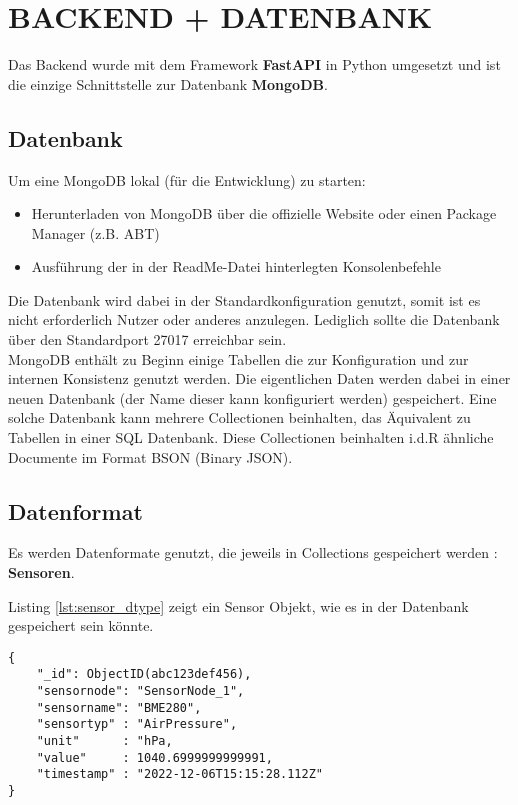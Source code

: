 \section{BACKEND + DATENBANK}\label{ch:backend}

Das Backend wurde mit dem Framework \textbf{FastAPI} in Python umgesetzt und ist die einzige Schnittstelle zur Datenbank \textbf{MongoDB}.

\subsection{Datenbank}
Um eine MongoDB lokal (für die Entwicklung) zu starten:
\begin{itemize}
\item Herunterladen von MongoDB über die offizielle Website oder einen Package Manager (z.B. ABT)
\item Ausführung der in der ReadMe-Datei hinterlegten Konsolenbefehle
\end{itemize}
Die Datenbank wird dabei in der Standardkonfiguration genutzt, somit ist es nicht erforderlich Nutzer oder anderes anzulegen.
Lediglich sollte die Datenbank über den Standardport 27017 erreichbar sein. \\

MongoDB enthält zu Beginn einige Tabellen die zur Konfiguration und zur internen Konsistenz genutzt werden.
Die eigentlichen Daten werden dabei in einer neuen Datenbank (der Name dieser kann konfiguriert werden) gespeichert.
Eine solche Datenbank kann mehrere Collectionen beinhalten, das Äquivalent zu Tabellen in einer SQL Datenbank.
Diese Collectionen beinhalten i.d.R ähnliche Documente im Format BSON (Binary JSON). 

\subsection{Datenformat}
Es werden Datenformate genutzt, die jeweils in Collections gespeichert werden : \textbf{Sensoren}.

Listing \ref{lst:sensor_dtype} zeigt ein Sensor Objekt, wie es in der Datenbank gespeichert sein könnte.
\begin{lstlisting}[caption={Sensor Objekt},captionpos=b,showstringspaces=false, basicstyle=\small,label={lst:sensor_dtype}]
{
    "_id": ObjectID(abc123def456),
    "sensornode": "SensorNode_1",
    "sensorname": "BME280",
    "sensortyp" : "AirPressure",
    "unit"      : "hPa,
    "value"     : 1040.6999999999991,
    "timestamp" : "2022-12-06T15:15:28.112Z"
}
\end{lstlisting}

